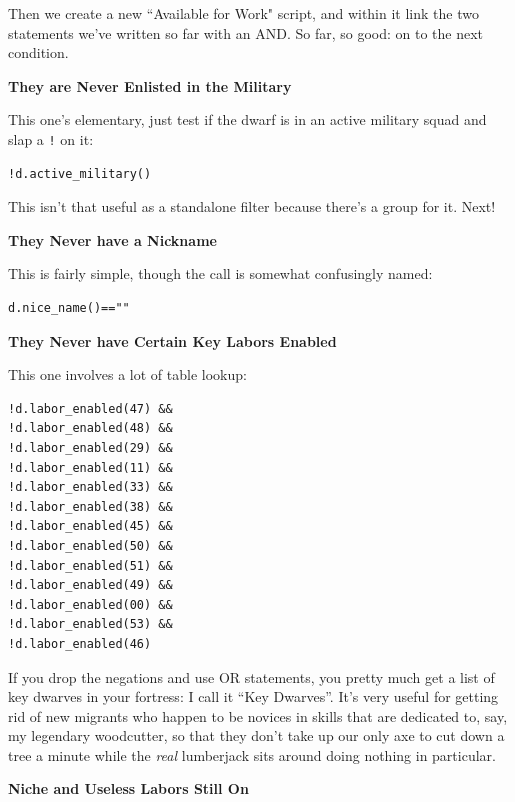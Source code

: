 \documentclass[]{article}
\begin{document}
Then we create a new ``Available for Work" script, and within it link the two statements we've written so
far with an AND. So far, so good: on to the next condition.
\vspace{12pt}

\textbf{They are Never Enlisted in the Military}

This one's elementary, just test if the dwarf is in an active military squad and slap a \texttt{!} on it:
\begin{verbatim}
!d.active_military()
\end{verbatim}

This isn't that useful as a standalone filter because there's a group for it. Next!
\vspace{12pt}

\textbf{They Never have a Nickname}

This is fairly simple, though the call is somewhat confusingly named:

\begin{verbatim}
d.nice_name()==""
\end{verbatim}

\vspace{12pt}

\textbf{They Never have Certain Key Labors Enabled}

This one involves a lot of table lookup:
\begin{multicols}{3}
\begin{verbatim}
!d.labor_enabled(47) &&
!d.labor_enabled(48) &&
!d.labor_enabled(29) &&
!d.labor_enabled(11) &&
!d.labor_enabled(33) &&
!d.labor_enabled(38) &&
!d.labor_enabled(45) &&
!d.labor_enabled(50) &&
!d.labor_enabled(51) &&
!d.labor_enabled(49) &&
!d.labor_enabled(00) &&
!d.labor_enabled(53) &&
!d.labor_enabled(46)
\end{verbatim}
\end{multicols}

If you drop the negations and use OR statements, you pretty much get a list of key dwarves in your
fortress: I call it ``Key Dwarves''. It's very useful for getting rid of new migrants who happen to be
novices in skills that are dedicated to, say, my legendary woodcutter, so that they don't take up our
only axe to cut down a tree a minute while the \emph{real} lumberjack sits around doing nothing in
particular.
\vspace{12pt}

\textbf{Niche and Useless Labors Still On}
\end{document}
